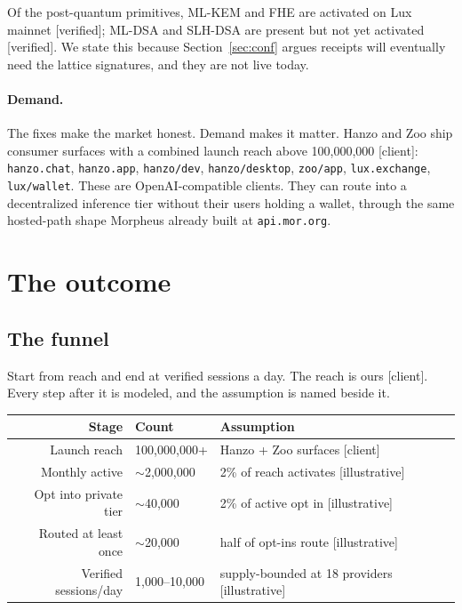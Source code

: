 \documentclass[11pt,a4paper]{article}
\newcommand{\code}[1]{\texttt{\small #1}}
\begin{document}
Of the post-quantum primitives, ML-KEM and FHE are activated on Lux mainnet
[verified]; ML-DSA and SLH-DSA are present but not yet activated [verified]. We
state this because Section~\ref{sec:conf} argues receipts will eventually need
the lattice signatures, and they are not live today.

\paragraph{Demand.} The fixes make the market honest. Demand makes it matter.
Hanzo and Zoo ship consumer surfaces with a combined launch reach above
100,000,000 [client]: \code{hanzo.chat}, \code{hanzo.app}, \code{hanzo/dev},
\code{hanzo/desktop}, \code{zoo/app}, \code{lux.exchange}, \code{lux/wallet}.
These are OpenAI-compatible clients. They can route into a decentralized
inference tier without their users holding a wallet, through the same hosted-path
shape Morpheus already built at \code{api.mor.org}.

\section{The outcome}
\label{sec:outcome}

\subsection{The funnel}

Start from reach and end at verified sessions a day. The reach is ours [client].
Every step after it is modeled, and the assumption is named beside it.

\begin{center}
\begin{tabular}{@{}rll@{}}
\toprule
\textbf{Stage} & \textbf{Count} & \textbf{Assumption} \\
\midrule
Launch reach            & 100{,}000{,}000+ & Hanzo + Zoo surfaces [client] \\
Monthly active          & $\sim$2{,}000{,}000 & 2\% of reach activates [illustrative] \\
Opt into private tier   & $\sim$40{,}000  & 2\% of active opt in [illustrative] \\
Routed at least once    & $\sim$20{,}000  & half of opt-ins route [illustrative] \\
Verified sessions/day   & 1{,}000--10{,}000 & supply-bounded at 18 providers [illustrative] \\
\bottomrule
\end{tabular}
\end{center}
\end{document}
